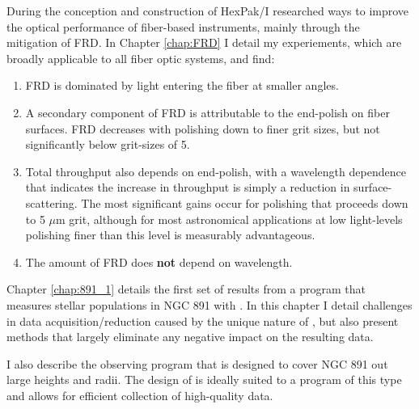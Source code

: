 During the conception and construction of HexPak/\GP I researched ways
to improve the optical performance of fiber-based instruments, mainly
through the mitigation of FRD. In Chapter \ref{chap:FRD} I detail my
experiements, which are broadly applicable to all fiber optic systems,
and find:
\begin{enumerate}

\item FRD is dominated by light entering the fiber at smaller angles.

\item A secondary component of FRD is attributable to the end-polish
  on fiber surfaces. FRD decreases with polishing down to finer grit
  sizes, but not significantly below grit-sizes of 5\mum.

\item Total throughput also depends on end-polish, with a wavelength
  dependence that indicates the increase in throughput is simply a
  reduction in surface-scattering.  The most significant gains occur
  for polishing that proceeds down to 5 $\mu$m grit, although for most
  astronomical applications at low light-levels polishing finer than
  this level is measurably advantageous.

\item The amount of FRD does \textbf{not} depend on wavelength.

\end{enumerate}

Chapter \ref{chap:891_1} details the first set of results from a
program that measures stellar populations in NGC 891 with \GP. In this
chapter I detail challenges in data acquisition/reduction caused by
the unique nature of \GP, but also present methods that largely
eliminate any negative impact on the resulting data.

I also describe the observing program that is designed to cover NGC
891 out large heights and radii. The design of \GP is ideally suited
to a program of this type and allows for efficient collection of
high-quality data.

